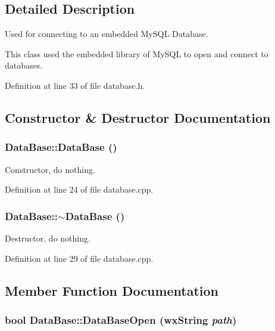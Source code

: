 \subsection{Detailed Description}
Used for connecting to an embedded My\-SQL Database. 

This class used the embedded library of My\-SQL to open and connect to databases. 



Definition at line 33 of file database.h.

\subsection{Constructor \& Destructor Documentation}
\subsubsection{\setlength{\rightskip}{0pt plus 5cm}Data\-Base::Data\-Base ()}\label{class_data_base_9fbd4936704ce4de391f92e92a072074}


Constructor, do nothing. 



Definition at line 24 of file database.cpp.
\subsubsection{\setlength{\rightskip}{0pt plus 5cm}Data\-Base::$\sim$Data\-Base ()\hspace{0.3cm}{\tt  [virtual]}}\label{class_data_base_9d4629e705ccaa4897e9650222a2a648}


Destructor, do nothing. 



Definition at line 29 of file database.cpp.

\subsection{Member Function Documentation}
\subsubsection{\setlength{\rightskip}{0pt plus 5cm}bool Data\-Base::Data\-Base\-Open (wx\-String {\em path})}\label{class_data_base_c49c112c59d7dcf4d501f3b8cf4295e7}


